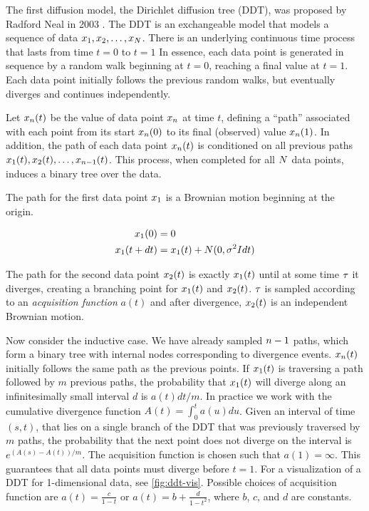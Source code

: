 The first diffusion model, the Dirichlet diffusion tree (DDT),
was proposed by Radford Neal in 2003 \citep{Neal2003}.
The DDT is an exchangeable model that models a sequence of data
$x_1, x_2,\ldots,x_N$.
There is an underlying continuous time process
that lasts from time $t = 0$ to $t = 1$
In essence, each data point is generated in sequence by
a random walk beginning at $t = 0$,
reaching a final value at $t = 1$.
Each data point initially follows the previous
random walks, but eventually diverges and continues independently.

Let $x_n(t)$ be the value of data point $x_n$
at time $t$, defining a ``path'' associated
with each point from its start $x_n(0)$ to its final (observed) value $x_n(1)$.
In addition, the path of each data point $x_n(t)$ is conditioned
on all previous paths $x_1(t), x_2(t), \ldots, x_{n - 1}(t)$.
This process, when completed for all $N$ data points,
induces a binary tree over the data.

The path for the first data point $x_1$
is a Brownian motion
beginning at the origin.

\begin{align}
  x_1(0) &= 0 \\
  x_1(t + dt) &= x_1(t) + N(0, \sigma^2Idt)
\end{align}

The path for the second data point $x_2(t)$
is exactly $x_1(t)$ until
at some time $\tau$ it diverges,
creating a branching point for
$x_1(t)$ and $x_2(t)$.
$\tau$ is sampled according to an \emph{acquisition function}
$a(t)$ and
after divergence, $x_2(t)$ is an
independent Brownian motion.

Now consider the inductive case.
We have already sampled $n - 1$
paths, which form a binary tree
with internal nodes corresponding to
divergence events.
$x_n(t)$ initially follows the same
path as the previous points.
If $x_1(t)$ is traversing a path
followed by $m$ previous paths,
the probability that $x_1(t)$ will
diverge along an infinitesimally small
interval $d$ is 
$a(t)dt/m$. 
In practice we work with the cumulative
divergence function $A(t) = \int_0^t a(u)du$.
Given an interval of time $(s, t)$,
that lies on a single branch of the DDT
that was previously traversed by $m$ paths,
the probability that the next point
does not diverge on the interval
is $e^{(A(s) - A(t))/m}$.
The acquisition function is chosen such that
$a(1) = \infty$. This guarantees that
all data points must diverge 
before $t = 1$. 
For a visualization of a DDT
for 1-dimensional data, see \autoref{fig:ddt-vis}.
Possible choices of acquisition function
are $a(t) = \frac{c}{1 - t}$ or $a(t) = b + \frac{d}{1 - t^2}$,
where $b$, $c$, and $d$ are constants.


